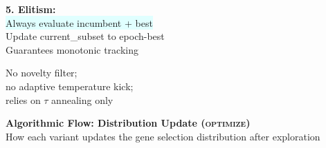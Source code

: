 \documentclass[8pt]{article}
\newlength{\colw}
\begin{document}
\begin{minipage}[t]{\colw}
\begin{keyboxB}
\textbf{5. Elitism:}\\
\colorbox{lightcyan}{Always evaluate incumbent + best}\\
Update current\_subset to epoch-best\\
{\scriptsize\color{addedB} Guarantees monotonic tracking}
\end{keyboxB}

\vspace{3pt}
\begin{center}
{\scriptsize\color{black!50} No novelty filter;\\
no adaptive temperature kick;\\
relies on $\tau$ annealing only}
\end{center}
\end{minipage}

\newpage
\setlength{\colw}{0.315\textwidth}

\begin{center}
{\large\bfseries Algorithmic Flow: Distribution Update (\textsc{optimize})}\\[1pt]
{\scriptsize How each variant updates the gene selection distribution after exploration}
\end{center}
\vspace{2pt}
\end{document}
